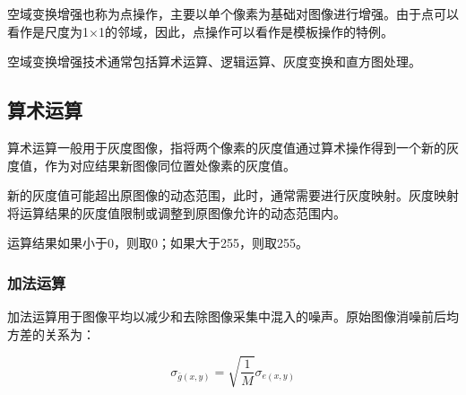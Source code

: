 \documentclass[cn, blue, normal, 12pt]{elegantnote}
\begin{document}
空域变换增强也称为点操作，主要以单个像素为基础对图像进行增强。由于点可以看作是尺度为1×1的邻域，因此，点操作可以看作是模板操作的特例。

空域变换增强技术通常包括算术运算、逻辑运算、灰度变换和直方图处理。

\subsection{算术运算}

算术运算一般用于灰度图像，指将两个像素的灰度值通过算术操作得到一个新的灰度值，作为对应结果新图像同位置处像素的灰度值。

新的灰度值可能超出原图像的动态范围，此时，通常需要进行灰度映射。灰度映射将运算结果的灰度值限制或调整到原图像允许的动态范围内。

运算结果如果小于0，则取0；如果大于255，则取255。

\subsubsection{加法运算}

加法运算用于图像平均以减少和去除图像采集中混入的噪声。原始图像消噪前后均方差的关系为：

\begin{equation}
    \sigma_{\bar{g}(x,y)}=\sqrt{\frac{1}{M}}\sigma_{e(x,y)}
\end{equation}
\end{document}
